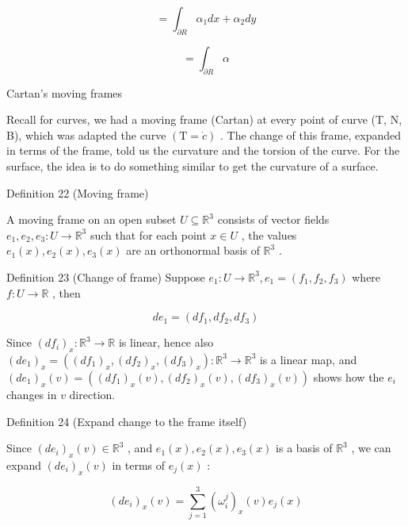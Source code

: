 \documentclass[lang=cn,a4paper,11pt,openany,twoside]{elegantbook}
\begin{document}
\[
= {\int }_{\partial R}{\alpha }_{1}{dx} + {\alpha }_{2}{dy}
\]

\[
= {\int }_{\partial R}\alpha
\]

Cartan's moving frames

Recall for curves, we had a moving frame (Cartan) at every point of curve (T, N, B), which was adapted the curve \(\left( {\mathrm{T} = \dot{c}}\right)\) . The change of this frame, expanded in terms of the frame, told us the curvature and the torsion of the curve. For the surface, the idea is to do something similar to get the curvature of a surface.

Definition 22 (Moving frame)

A moving frame on an open subset \(U \subseteq  {\mathbb{R}}^{3}\) consists of vector fields \({e}_{1},{e}_{2},{e}_{3} : U \rightarrow  {\mathbb{R}}^{3}\) such that for each point \(x \in  U\) , the values \({e}_{1}\left( x\right) ,{e}_{2}\left( x\right) ,{e}_{3}\left( x\right)\) are an orthonormal basis of \({\mathbb{R}}^{3}\) .

Definition 23 (Change of frame) Suppose \({e}_{1} : U \rightarrow  {\mathbb{R}}^{3},{e}_{1} = \left( {{f}_{1},{f}_{2},{f}_{3}}\right)\) where \(f : U \rightarrow  \mathbb{R}\) , then

\[
d{e}_{1} = \left( {d{f}_{1},d{f}_{2},d{f}_{3}}\right)
\]

Since \({\left( d{f}_{i}\right) }_{x} : {\mathbb{R}}^{3} \rightarrow  \mathbb{R}\) is linear, hence also \({\left( d{e}_{1}\right) }_{x} = \left( {{\left( d{f}_{1}\right) }_{x},{\left( d{f}_{2}\right) }_{x},{\left( d{f}_{3}\right) }_{x}}\right)  : {\mathbb{R}}^{3} \rightarrow  {\mathbb{R}}^{3}\) is a linear map, and \({\left( d{e}_{1}\right) }_{x}\left( v\right)  = \left( {{\left( d{f}_{1}\right) }_{x}\left( v\right) ,{\left( d{f}_{2}\right) }_{x}\left( v\right) ,{\left( d{f}_{3}\right) }_{x}\left( v\right) }\right)\) shows how the \({e}_{i}\) changes in \(v\) direction.

Definition 24 (Expand change to the frame itself)

Since \({\left( d{e}_{i}\right) }_{x}\left( v\right)  \in  {\mathbb{R}}^{3}\) , and \({e}_{1}\left( x\right) ,{e}_{2}\left( x\right) ,{e}_{3}\left( x\right)\) is a basis of \({\mathbb{R}}^{3}\) , we can expand \({\left( d{e}_{i}\right) }_{x}\left( v\right)\) in terms of \({e}_{j}\left( x\right)\) :

\[
{\left( d{e}_{i}\right) }_{x}\left( v\right)  = \mathop{\sum }\limits_{{j = 1}}^{3}{\left( {\omega }_{i}^{j}\right) }_{x}\left( v\right) {e}_{j}\left( x\right)
\]
\end{document}
